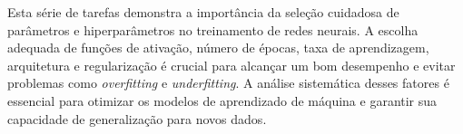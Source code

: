 Esta série de tarefas demonstra a importância da seleção cuidadosa 
de parâmetros e hiperparâmetros no treinamento de redes neurais. A escolha 
adequada de funções de ativação, número de épocas, taxa de aprendizagem, 
arquitetura e regularização é crucial para alcançar um bom desempenho e 
evitar 
problemas como \textit{overfitting} e \textit{underfitting}. A análise 
sistemática desses 
fatores é essencial para otimizar os modelos de aprendizado de máquina e 
garantir sua capacidade de generalização para novos dados.